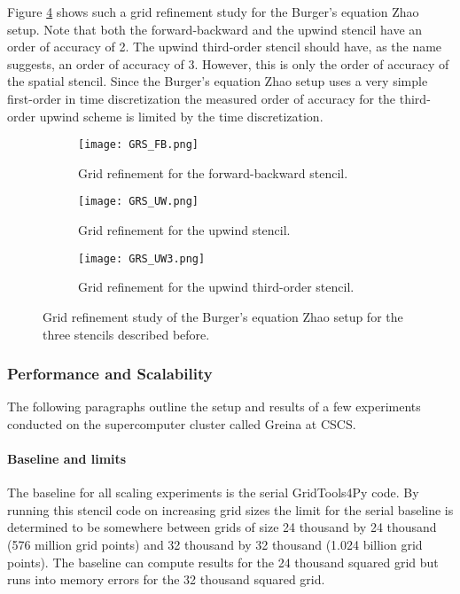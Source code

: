 Figure \ref{fig:grs} shows such a grid refinement study for the Burger's equation Zhao setup.
Note that both the forward-backward and the upwind stencil have an order of accuracy of 2.
The upwind third-order stencil should have, as the name suggests, an order of accuracy of 3.
However, this is only the order of accuracy of the spatial stencil.
Since the Burger's equation Zhao setup uses a very simple first-order in time discretization the measured order of accuracy for the third-order upwind scheme is limited by the time discretization.

\begin{figure}[!htbp]
\centering
\begin{subfigure}{0.8\textwidth}
  \centering
  \texttt{[image: GRS\_FB.png]}
  \caption{Grid refinement for the forward-backward stencil.}
  \label{fig:grs_1}
\end{subfigure}

\begin{subfigure}{0.8\textwidth}
  \centering
  \texttt{[image: GRS\_UW.png]}
  \caption{Grid refinement for the upwind stencil.}
  \label{fig:grs_2}
\end{subfigure}

\begin{subfigure}{0.8\textwidth}
  \centering
  \texttt{[image: GRS\_UW3.png]}
  \caption{Grid refinement for the upwind third-order stencil.}
  \label{fig:grs_3}
\end{subfigure}
\caption{Grid refinement study of the Burger's equation Zhao setup for the three stencils described before.}
\label{fig:grs}
\end{figure}

\subsubsection{Performance and Scalability}
The following paragraphs outline the setup and results of a few experiments conducted on the supercomputer cluster called Greina at CSCS.

\paragraph{Baseline and limits}
The baseline for all scaling experiments is the serial GridTools4Py code.
By running this stencil code on increasing grid sizes the limit for the serial baseline is determined to be somewhere between grids of size 24 thousand by 24 thousand (576 million grid points) and 32 thousand by 32 thousand (1.024 billion grid points).
The baseline can compute results for the 24 thousand squared grid but runs into memory errors for the 32 thousand squared grid.

